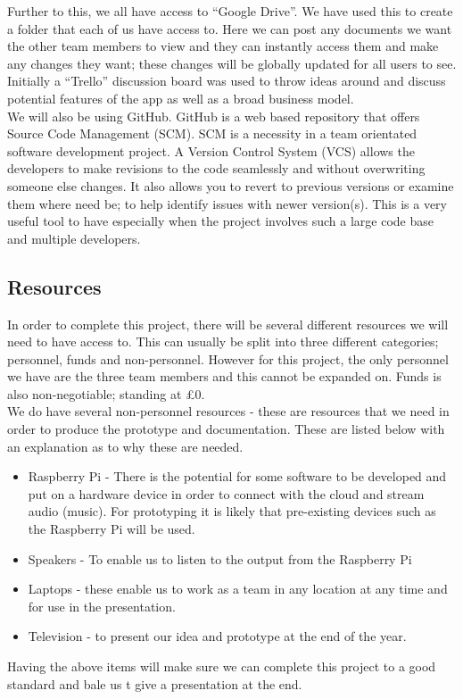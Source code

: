 Further to this, we all have access to ``Google Drive''.  We have used this to create a folder that each of us have access to.  Here we can post any documents we want the other team members to view and they can instantly access them and make any changes they want; these changes will be globally updated for all users to see.  \\
Initially a ``Trello'' discussion board was used to throw ideas around and discuss potential features of the app as well as a broad business model. \\
We will also be using GitHub.  GitHub is a web based repository that offers Source Code Management (SCM).  SCM is a necessity in a team orientated software development project.  A Version Control System (VCS) allows the developers to make revisions to the code seamlessly and without overwriting someone else changes.  It also allows you to revert to previous versions or examine them where need be; to help identify issues with newer version(s).  This is a very useful tool to have especially when the project involves such a large code base and multiple developers.  

\subsection{Resources}
In order to complete this project, there will be several different resources we will need to have access to.  This can usually be split into three different categories; personnel, funds and non-personnel.  However for this project, the only personnel we have are the three team members and this cannot be expanded on.  Funds is also non-negotiable; standing at £0.  \\
We do have several non-personnel resources - these are resources that we need in order to produce the prototype and documentation.  These are listed below with an explanation as to why these are needed.
\begin{itemize}
\item Raspberry Pi - There is the potential for some software to be developed and put on a hardware device in order to connect with the cloud and stream audio (music).  For prototyping it is likely that pre-existing devices such as the Raspberry Pi will be used. 
\item Speakers - To enable us to listen to the output from the Raspberry Pi
\item Laptops - these enable us to work as a team in any location at any time and for use in the presentation.  
\item Television - to present our idea and prototype at the end of the year.
\end{itemize}
Having the above items will make sure we can complete this project to a good standard and bale us t give a presentation at the end.    

